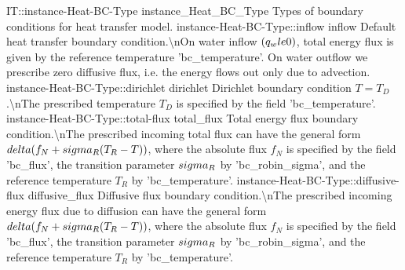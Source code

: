 \begin{SelectionType}
	{IT::instance-Heat-BC-Type}
	{instance{\_}Heat{\_}BC{\_}Type}
	{{{Types of boundary conditions for heat transfer model.}%
}}
		\SelectionItem
			{instance-Heat-BC-Type::inflow}
			{inflow}
			{{{Default heat transfer boundary condition.{\textbackslash}nOn water inflow }{$(q_w \\le 0)$}{, total energy flux is given by the reference temperature 'bc{\_}temperature'. On water outflow we prescribe zero diffusive flux, i.e. the energy flows out only due to advection.}%
}}
		\SelectionItem
			{instance-Heat-BC-Type::dirichlet}
			{dirichlet}
			{{{Dirichlet boundary condition }{$T = T_D $}{.{\textbackslash}nThe prescribed temperature }{$T_D$}{ is specified by the field 'bc{\_}temperature'.}%
}}
		\SelectionItem
			{instance-Heat-BC-Type::total-flux}
			{total{\_}flux}
			{{{Total energy flux boundary condition.{\textbackslash}nThe prescribed incoming total flux can have the general form }{$\\delta(f_N+\\sigma_R(T_R-T) )$}{, where the absolute flux }{$f_N$}{ is specified by the field 'bc{\_}flux', the transition parameter }{$\\sigma_R$}{ by 'bc{\_}robin{\_}sigma', and the reference temperature }{$T_R$}{ by 'bc{\_}temperature'.}%
}}
		\SelectionItem
			{instance-Heat-BC-Type::diffusive-flux}
			{diffusive{\_}flux}
			{{{Diffusive flux boundary condition.{\textbackslash}nThe prescribed incoming energy flux due to diffusion can have the general form }{$\\delta(f_N+\\sigma_R(T_R-T) )$}{, where the absolute flux }{$f_N$}{ is specified by the field 'bc{\_}flux', the transition parameter }{$\\sigma_R$}{ by 'bc{\_}robin{\_}sigma', and the reference temperature }{$T_R$}{ by 'bc{\_}temperature'.}%
}}
\end{SelectionType}
